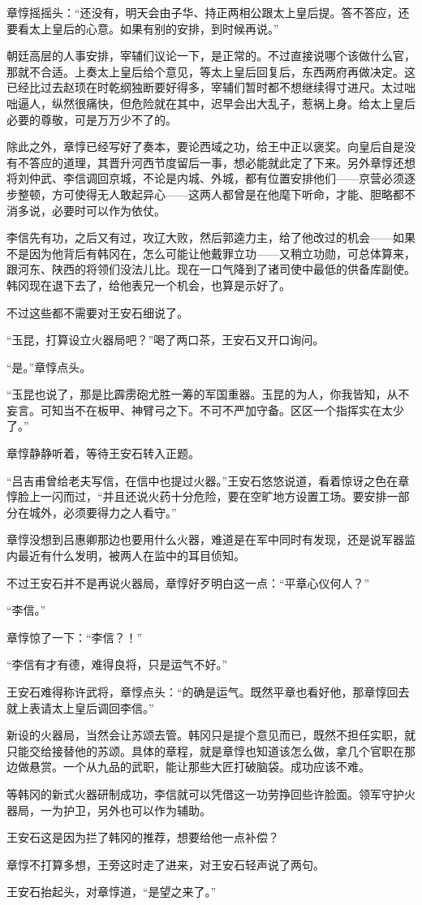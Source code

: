 章惇摇摇头：“还没有，明天会由子华、持正两相公跟太上皇后提。答不答应，还要看太上皇后的心意。如果有别的安排，到时候再说。”

朝廷高层的人事安排，宰辅们议论一下，是正常的。不过直接说哪个该做什么官，那就不合适。上奏太上皇后给个意见，等太上皇后回复后，东西两府再做决定。这已经比过去赵顼在时乾纲独断要好得多，宰辅们暂时都不想继续得寸进尺。太过咄咄逼人，纵然很痛快，但危险就在其中，迟早会出大乱子，惹祸上身。给太上皇后必要的尊敬，可是万万少不了的。

除此之外，章惇已经写好了奏本，要论西域之功，给王中正以褒奖。向皇后自是没有不答应的道理，其晋升河西节度留后一事，想必能就此定了下来。另外章惇还想将刘仲武、李信调回京城，不论是内城、外城，都有位置安排他们——京营必须逐步整顿，方可使得无人敢起异心——这两人都曾是在他麾下听命，才能、胆略都不消多说，必要时可以作为依仗。

李信先有功，之后又有过，攻辽大败，然后郭逵力主，给了他改过的机会——如果不是因为他背后有韩冈在，怎么可能让他戴罪立功——又稍立功勋，可总体算来，跟河东、陕西的将领们没法儿比。现在一口气降到了诸司使中最低的供备库副使。韩冈现在退下去了，给他表兄一个机会，也算是示好了。

不过这些都不需要对王安石细说了。

“玉昆，打算设立火器局吧？”喝了两口茶，王安石又开口询问。

“是。”章惇点头。

“玉昆也说了，那是比霹雳砲尤胜一筹的军国重器。玉昆的为人，你我皆知，从不妄言。可知当不在板甲、神臂弓之下。不可不严加守备。区区一个指挥实在太少了。”

章惇静静听着，等待王安石转入正题。

“吕吉甫曾给老夫写信，在信中也提过火器。”王安石悠悠说道，看着惊讶之色在章惇脸上一闪而过，“并且还说火药十分危险，要在空旷地方设置工场。要安排一部分在城外，必须要得力之人看守。”

章惇没想到吕惠卿那边也要用什么火器，难道是在军中同时有发现，还是说军器监内最近有什么发明，被两人在监中的耳目侦知。

不过王安石并不是再说火器局，章惇好歹明白这一点：“平章心仪何人？”

“李信。”

章惇惊了一下：“李信？！”

“李信有才有德，难得良将，只是运气不好。”

王安石难得称许武将，章惇点头：“的确是运气。既然平章也看好他，那章惇回去就上表请太上皇后调回李信。”

新设的火器局，当然会让苏颂去管。韩冈只是提个意见而已，既然不担任实职，就只能交给接替他的苏颂。具体的章程，就是章惇也知道该怎么做，拿几个官职在那边做悬赏。一个从九品的武职，能让那些大匠打破脑袋。成功应该不难。

等韩冈的新式火器研制成功，李信就可以凭借这一功劳挣回些许脸面。领军守护火器局，一为护卫，另外也可以作为辅助。

王安石这是因为拦了韩冈的推荐，想要给他一点补偿？

章惇不打算多想，王旁这时走了进来，对王安石轻声说了两句。

王安石抬起头，对章惇道，“是望之来了。”

